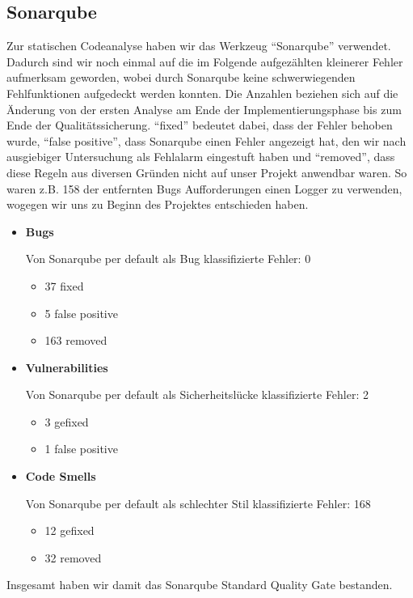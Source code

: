 \documentclass[parskip=full]{scrartcl}
\begin{document}
\subsection{Sonarqube}
Zur statischen Codeanalyse haben wir das Werkzeug \enquote{Sonarqube} verwendet. Dadurch sind wir noch einmal auf die im Folgende aufgezählten kleinerer Fehler aufmerksam geworden, wobei durch Sonarqube keine schwerwiegenden Fehlfunktionen aufgedeckt werden konnten. Die Anzahlen beziehen sich auf die Änderung von der ersten Analyse am Ende der Implementierungsphase bis zum Ende der Qualitätssicherung. \enquote{fixed} bedeutet dabei, dass der Fehler behoben wurde, \enquote{false positive}, dass Sonarqube einen Fehler angezeigt hat, den wir nach ausgiebiger Untersuchung als Fehlalarm eingestuft haben und \enquote{removed}, dass diese Regeln aus diversen Gründen nicht auf unser Projekt anwendbar waren. So waren z.B. 158 der entfernten Bugs Aufforderungen einen Logger zu verwenden, wogegen wir uns zu Beginn des Projektes entschieden haben.
\begin{itemize}[noitemsep]
	\item \textbf{Bugs} 
	
	Von Sonarqube per default als Bug klassifizierte Fehler: 0
	\begin{itemize}
		\item 37 fixed
		\item 5 false positive
		\item 163 removed
	\end{itemize}
	\item \textbf{Vulnerabilities}
	 
	Von Sonarqube per default als Sicherheitslücke klassifizierte Fehler: 2
	\begin{itemize}
		\item 3 gefixed
		\item 1 false positive
	\end{itemize}
	\item \textbf{Code Smells} 
	
	Von Sonarqube per default als schlechter Stil klassifizierte Fehler: 168
	\begin{itemize}
		\item 12 gefixed
		\item 32 removed
	\end{itemize}
\end{itemize}

Insgesamt haben wir damit das Sonarqube Standard Quality Gate bestanden.
\end{document}
